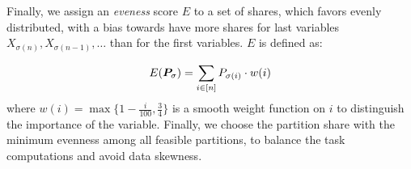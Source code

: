 Finally, we assign an \emph{eveness} score $E$ to a set of shares,
which favors evenly distributed, with a bias towards have more shares
for last variables $X_{\sigma(n)}, X_{\sigma(n-1)}, \ldots$ than for
the first variables.  $E$ is defined as:

\begin{equation}
  E(\bm{P}_{\sigma}) = \sum_{i \in [n]} P_{\sigma(i)} \cdot w(i)
\end{equation}
where $w(i) = \max\{1 - \frac{i}{100}, \frac{3}{4}\}$ is a smooth weight function on $i$ to distinguish the importance of the variable. Finally, we choose the partition share with the minimum evenness among all feasible partitions, to balance the task computations and avoid data skewness.